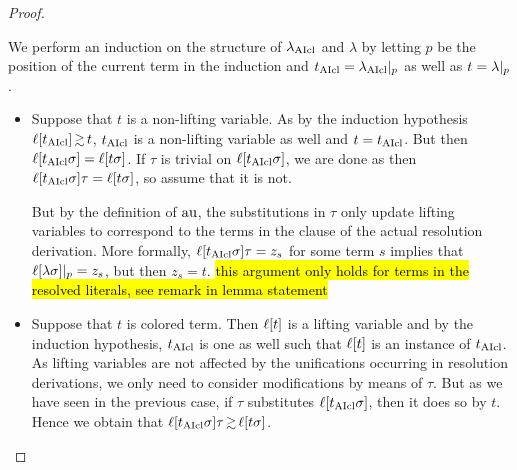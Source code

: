 \documentclass[,%
	draft=false,%
	numbers=noendperiod
	11pt,
	a4paper,
	oneside,%
	openany,
]{memoir}
\begin{document}
{\begin{proof}
\begin{description}


				We perform an induction on the structure of $\lambda_{\operatorname{AIcl}}$ and $\lambda$
				by letting $p$ be the position of the current term in the induction and $t_{\operatorname{AIcl}} = \lambda_{\operatorname{AIcl}}|_{p}$ as well as $t=\lambda|_{p}$.
				\begin{itemize}
					\item
						Suppose that $t$ is a non-lifting variable.
						As by the induction hypothesis $\lifboth{t\cl} \simgeq t$, $t_{\operatorname{AIcl}}$ is a non-lifting variable as well and $t = t_{\operatorname{AIcl}}$.
						But then $\ell[t_{\operatorname{AIcl}}\sigma] = \ell[t\sigma]$.
						If $\tau$ is trivial on $\ell[t_{\operatorname{AIcl}}\sigma]$, we are done as then $\ell[t_{\operatorname{AIcl}}\sigma]\tau = \ell[t\sigma]$, so assume that it is not.

						But by the definition of $\operatorname{au}$, the substitutions in $\tau$ only update lifting variables to correspond to the terms in the clause of the actual resolution derivation.
						More formally, $\ell[t_{\operatorname{AIcl}}\sigma]\tau = z_s$ for some term $s$ implies that $\ell[\lambda\sigma]|_{p} = z_s$, but then $z_s = t$.
						\hl{this argument only holds for terms in the resolved literals, see remark in lemma statement}

					\item
						Suppose that $t$ is colored term.
						Then $\ell[t]$ is a lifting variable and by the induction hypothesis, $t_{\operatorname{AIcl}}$ is one as well such that
						$\ell[t]$ is an instance of $t_{\operatorname{AIcl}}$.
						As lifting variables are not affected by the unifications occurring in resolution derivations, we only need to consider modifications by means of $\tau$.
						But as we have seen in the previous case, if $\tau$ substitutes $\ell[t_{\operatorname{AIcl}}\sigma]$, then it does so by $t$.
						Hence we obtain that $\lifboth{t\cl\sigma}\tau \simgeq \lifboth{t\sigma}$.


\end{itemize}
\end{description}
\end{proof}}
\end{document}
